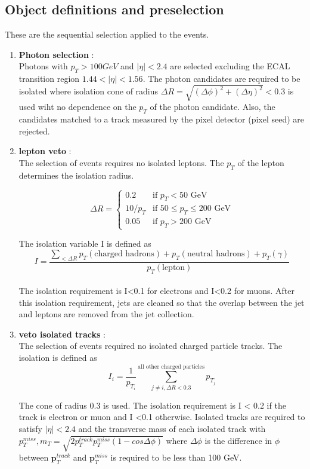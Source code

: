 \documentclass[a4paper, 10pt]{article}
\renewcommand{\vec}[1]{\mathbf{#1}}
\begin{document}
\subsection{Object definitions and preselection}
These are the sequential selection applied to the events. 

\begin{enumerate}
\item \textbf{Photon selection} : \\ 
Photons with $p_{T} > 100 GeV$ and $|\eta| < 2.4$ are selected excluding the ECAL transition region $1.44 < |\eta| < 1.56$. The photon candidates are required to be isolated where isolation cone of radius $\Delta R = \sqrt{(\Delta\phi)^{2} + (\Delta\eta)^{2}} < 0.3$ is used wiht no dependence on the $p_{T}$ of the photon candidate. Also, the candidates matched to a track measured by the pixel detector (pixel seed) are rejected. 

\item \textbf{lepton veto} : \\
The selection of events requires no isolated leptons. The $p_{T}$ of the lepton determines the isolation radius. 
 
\[
  \Delta R =
  \begin{cases}
                                   0.2 & \text{if $p_T < 50$ GeV} \\
                                   10/p_T & \text{if $50 \leq p_T \leq 200$ GeV} \\
                                   0.05 & \text{if $p_T>200$ GeV}
  \end{cases}
\]

The isolation variable I is defined as
$$ I = \frac{\sum_{<\Delta R}p_{T}(\text{charged hadrons}) + p_{T}(\text{neutral hadrons}) + p_{T}(\gamma) }{p_{T} (\text {lepton})} $$
\\
The isolation requirement is I<0.1 for electrons and I<0.2 for muons. After this isolation requirement, jets are cleaned \cite{jet_clean} so that the overlap between the jet and leptons are removed from the jet collection. 

\item \textbf{veto isolated tracks} : \\
The selection of events required no isolated charged particle tracks. The isolation is defined as 
$$ I_{i} = \frac{1}{p_{T_i}}\sum_{j \neq i, \Delta R < 0.3}^{\text{all other charged particles}} p_{T_j} $$

The cone of radius 0.3 is used. The isolation requirement is I < 0.2 if the track is electron or muon and I <0.1 otherwise. Isolated tracks are required to satisfy $|\eta| < 2.4$ and the transverse mass of each isolated track with $p_{T}^{miss}, m_{T} = \sqrt{2p_{T}^{track}p_{T}^{miss}(1-cos\Delta\phi)}$ where $\Delta\phi$ is the difference in $\phi$ between $\vec{p}_{T}^{track}$ and $\vec{p}_{T}^{miss}$ is required to be less than 100 GeV. 


\end{enumerate}
\end{document}
